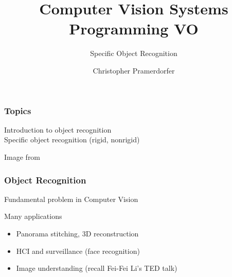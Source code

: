 \documentclass[xetex,professionalfont]{beamer}
\title{Computer Vision Systems Programming VO}
\subtitle{Specific Object Recognition}
\author{Christopher Pramerdorfer}
\institute{Computer Vision Lab, Vienna University of Technology}
\begin{document}

\begin{frame}
\maketitle
\end{frame}


\begin{frame}
\frametitle{Topics}

Introduction to object recognition \\
Specific object recognition (rigid, nonrigid)

\bigskip
\begin{center}
    {\centering Image from \cite{grauman2011}}
\end{center}

\end{frame}


\begin{frame}
\frametitle{Object Recognition}

Fundamental problem in Computer Vision

\bigskip
Many applications
\begin{itemize}
	\item Panorama stitching, 3D reconstruction
	\item HCI and surveillance (face recognition)
	\item Image understanding (recall Fei-Fei Li's TED talk)
\end{itemize}

\end{frame}

\end{document}
